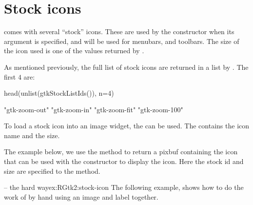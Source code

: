 \begin{Schunk}
\end{Schunk}
\section{Stock icons}
\label{sec:RGtk2:stock-icons}

\GTK\/ comes with several ``stock'' icons. These are used by the
 constructor when its  argument
is specified, and will be used for menubars, and toolbars. The size of
the icon used is one of the values returned by .

As mentioned previously, the full list of stock icons are returned in
a list by . The first $4$ are:
\begin{Schunk}
\begin{Sinput}
 head(unlist(gtkStockListIds()), n=4)   
\end{Sinput}
\begin{Soutput}
[1] "gtk-zoom-out" "gtk-zoom-in"  "gtk-zoom-fit" "gtk-zoom-100"
\end{Soutput}
\end{Schunk}

To load a stock icon into an image widget, the
 can be used. The
 contains the icon name and
 the size. 

The example below, we use the method  to
return a pixbuf containing the icon that can be used with the
constructor  to display the
icon. Here the stock id and size are specified to the
 method.



\begin{example}{ -- the hard way}{ex:RGtk2:stock-icon}
The following example, shows how to do the work of
 by hand using an image and label together.
\begin{Schunk}
\end{Schunk}
\end{example}

